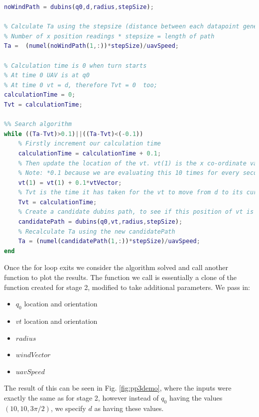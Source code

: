 \begin{minipage}{\linewidth}
\begin{lstlisting}[language=MATLAB]
% Ta starts as the time taken for the UAV to travel from q0 to d as if there was no wind, so
noWindPath = dubins(q0,d,radius,stepSize);

% Calculate Ta using the stepsize (distance between each datapoint generated by dubins function), and speed of uav.
% Number of x position readings * stepsize = length of path
Ta =  (numel(noWindPath(1,:))*stepSize)/uavSpeed; 

% Calculation time is 0 when turn starts
% At time 0 UAV is at q0
% At time 0 vt = d, therefore Tvt = 0  too;
calculationTime = 0;
Tvt = calculationTime;

%% Search algorithm
while ((Ta-Tvt)>0.1)||((Ta-Tvt)<(-0.1))
    % Firstly increment our calculation time
    calculationTime = calculationTime + 0.1;
    % Then update the location of the vt. vt(1) is the x co-ordinate value, this works because wind is always in only the x direction
    % Note: *0.1 because we are evaluating this 10 times for every second of calculationTime
    vt(1) = vt(1) + 0.1*vtVector;
    % Tvt is the time it has taken for the vt to move from d to its current location, so is equal to calculationTime
    Tvt = calculationTime;
    % Create a candidate dubins path, to see if this position of vt is a suitable solution for the search
    candidatePath = dubins(q0,vt,radius,stepSize);
    % Recalculate Ta using the new candidatePath
    Ta = (numel(candidatePath(1,:))*stepSize)/uavSpeed;
end
\end{lstlisting}
\end{minipage}

Once the for loop exits we consider the algorithm solved and call another function to plot the results. The function we call is essentially a clone of the function created for stage 2, modified to take additional parameters. We pass in:

\begin{itemize}
	\item $q_0$ location and orientation
	\item $vt$ location and orientation
	\item $radius$
	\item $windVector$
	\item $uavSpeed$
\end{itemize}

The result of this can be seen in Fig. \ref{fig:pp3demo}, where the inputs were exactly the same as for stage 2, however instead of $q_0$ having the values $(10,10,3\pi/2)$, we specify $d$ as having these values.

